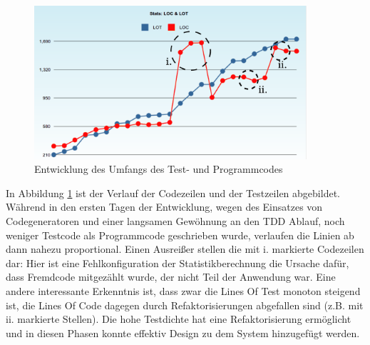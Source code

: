 \begin{figure}[htbp]
 \centering
 \includegraphics[width=0.9\textwidth]{./diagrams/itjobs-loclot.pdf}
 \caption{Entwicklung des Umfangs des Test- und Programmcodes}
 \label{fig:itjobsLoc}
\end{figure}

In Abbildung \ref{fig:itjobsLoc} ist der Verlauf der Codezeilen und der Testzeilen abgebildet. Während in den ersten Tagen der Entwicklung, wegen des Einsatzes von Codegeneratoren und einer langsamen Gewöhnung an den TDD Ablauf, noch weniger Testcode als Programmcode geschrieben wurde, verlaufen die Linien ab dann nahezu proportional. Einen Ausreißer stellen die mit i. markierte Codezeilen dar: Hier ist eine Fehlkonfiguration der Statistikberechnung die Ursache dafür, dass Fremdcode mitgezählt wurde, der nicht Teil der Anwendung war. Eine andere interessante Erkenntnis ist, dass zwar die Lines Of Test monoton steigend ist, die Lines Of Code dagegen durch Refaktorisierungen abgefallen sind (z.B. mit ii. markierte Stellen). Die hohe Testdichte hat eine Refaktorisierung ermöglicht und in diesen Phasen konnte effektiv Design zu dem System hinzugefügt werden.


